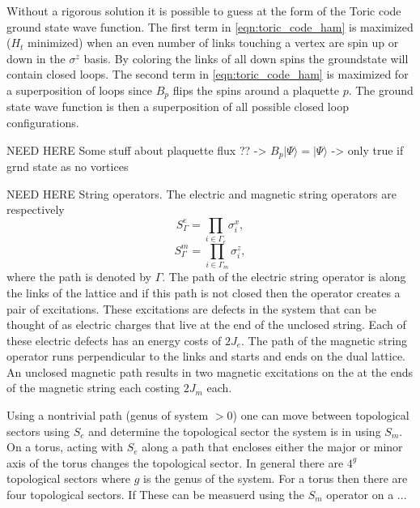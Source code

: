 \documentclass[twocolumn,prb,aps,floatfix,superscriptaddress]{revtex4-1}
\begin{document}
    Without a rigorous solution it is possible to guess at the form of the Toric code
    ground state wave function. The first term in \ref{eqn:toric_code_ham} is maximized ($H_t$
    minimized) when an even number of links touching a vertex are spin up or down in the
    $\sigma^z$ basis. By coloring the links of all down spins the groundstate will
    contain closed loops. The second term in \ref{eqn:toric_code_ham} is maximized for a
    superposition of loops since $B_p$ flips the spins around a plaquette $p$. The ground state
    wave function is then a superposition of all possible closed loop configurations. 
    
    NEED HERE Some stuff about plaquette flux ?? -> $B_p | \Psi \rangle = | \Psi \rangle$ -> only true if
    grnd state as no vortices

    NEED HERE String operators. The electric and magnetic string operators are respectively
    \begin{equation}
        S^e_{\Gamma} = \prod_{i\in\Gamma_e} \sigma^x_i
        ,
    \end{equation}
    \begin{equation}
        S^m_{\Gamma} = \prod_{i\in\Gamma_m} \sigma^z_i
        ,
    \end{equation}
    where the path is denoted by $\Gamma$. The path of the electric string operator is along the
    links of the lattice and if this path is not closed then the operator
    creates a pair of excitations. These excitations are defects in the system 
    that can be thought of as electric charges that live at the
    end of the unclosed string. Each of these electric defects has an energy costs of $2J_e$. 
    The path of the magnetic string operator runs perpendicular to the links
    and starts and ends on the dual lattice. An unclosed magnetic path results in two magnetic
    excitations on the at the ends of the magnetic string each costing $2J_m$ each. 

    Using a nontrivial path (genus of system $>0$) one can move between topological sectors using $S_e$ and determine
    the topological sector the system is in using $S_m$. On a torus, acting with $S_e$ along a
    path that encloses either the major or minor axis of the torus changes the topological sector.
    In general there are $4^g$ topological sectors where $g$ is the
    genus of the system. For a torus then there are four topological sectors. If These can be
    measuerd using the $S_m$ operator on a ...
\end{document}
